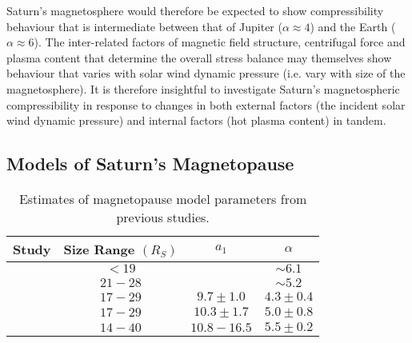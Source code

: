 Saturn's magnetosphere would therefore be expected to show compressibility behaviour that is intermediate between that of Jupiter ($\alpha \approx 4$) and the Earth ($\alpha \approx 6$). The inter-related factors of magnetic field structure, centrifugal force and plasma content that determine the overall stress balance may themselves show behaviour that varies with solar wind dynamic pressure (i.e. vary with size of the magnetosphere). It is therefore insightful to investigate Saturn's magnetospheric compressibility in response to changes in both external factors (the incident solar wind dynamic pressure) and internal factors (hot plasma content) in tandem.

\subsection{Models of Saturn's Magnetopause}\label{compress:sec:prevstudies}
\begin{table}
\caption[Estimates of magnetopause model parameters from previous studies.]{Estimates of magnetopause model parameters from previous studies.}\label{compress:table:prevstudies}
\centering
\begin{tabular}{c c c c}
\hline
Study & Size Range $(\si{R_S})$ & $a_1$ & $\alpha$   \\
\hline
{\citet{slavin1985}} & $< 19$ &  & $\sim 6.1$ \\
{\citet{hansen2005}}   & $21 - 28 $ &  & $\sim 5.2$ \\
{\citet{arridge2006}} & $17-29$ & $9.7 \pm 1.0 $ & $4.3 \pm 0.4$   \\
{\citet{kanani2010}} & $17-29$ & $10.3 \pm 1.7 $ & $5.0 \pm 0.8$ \\
{\citet{pilkington2015}} & $14 - 40$ & $10.8 - 16.5$ & $5.5 \pm 0.2$ \\
\hline
\end{tabular}
\end{table}
